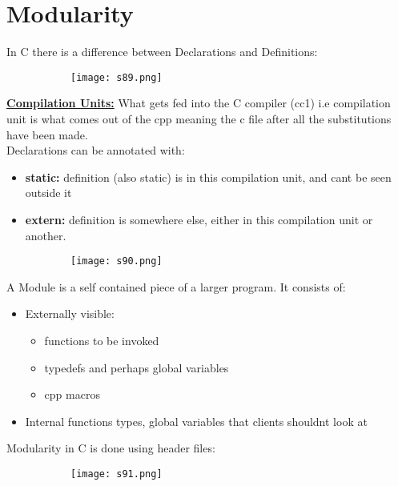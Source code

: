 \documentclass[8pt]{extreport}
\begin{document}
\section{Modularity}
In C there is a difference between Declarations and Definitions:
\begin{figure}[H]
\centering
\begin{subfigure}[b]{0.4\linewidth}
\texttt{[image: s89.png]}
\end{subfigure}
\end{figure}

\underline{\textbf{ Compilation Units:}} What gets fed into the C compiler (cc1) i.e compilation unit is what comes out of the cpp meaning the c file after all the substitutions have been made.\\
Declarations can be annotated with:
\begin{itemize}
\item \textbf{static:} definition (also static) is in this compilation unit, and cant be seen outside it
\item \textbf{extern:} definition is somewhere else, either in this compilation unit or another.
\end{itemize}
\begin{figure}[H]
\centering
\begin{subfigure}[b]{0.4\linewidth}
\texttt{[image: s90.png]}
\end{subfigure}
\end{figure}
A Module is a self contained piece of a larger program. It consists of:
\begin{itemize}
\item Externally visible:
\begin{itemize}
\item functions to be invoked
\item typedefs and perhaps global variables
\item cpp macros
\end{itemize}
\item Internal functions types, global variables that clients shouldnt look at
\end{itemize}
Modularity in C is done using header files:
\begin{figure}[H]
\centering
\begin{subfigure}[b]{0.4\linewidth}
\texttt{[image: s91.png]}
\end{subfigure}
\end{figure}
\end{document}
